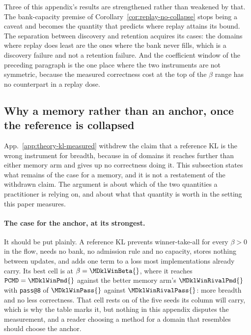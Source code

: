 \documentclass{article}
\newcommand{\1}{\mathbf 1}
\newcommand{\pmd}{\texttt{PCMD}}
\theoremstyle{remark}
\theoremstyle{definition}
\theoremstyle{plain}
\begin{document}
Three of this appendix's results are strengthened rather than weakened by that.
The bank-capacity premise of Corollary~\ref{cor:replay-no-collapse} stops being
a caveat and becomes the quantity that predicts where replay attains its bound.
The separation between discovery and retention acquires its cases: the domains
where replay does least are the ones where the bank never fills, which is a
discovery failure and not a retention failure. And the coefficient window of
the preceding paragraph is the one place where the two instruments are not
symmetric, because the measured correctness cost at the top of the $\beta$
range has no counterpart in a replay dose.

\subsection{Why a memory rather than an anchor, once the reference is collapsed}
\label{app:theory-kl-case}

App.~\ref{app:theory-kl-measured} withdrew the claim that a reference KL is the
wrong instrument for breadth, because in \MDklFreeDomains{} of \MDklDomains{}
domains it reaches further than either memory arm and gives up no correctness
doing it. This subsection states what remains of the
case for a memory, and it is not a restatement of the withdrawn claim. The
argument is about which of the two quantities a practitioner is relying on, and
about what that quantity is worth in the setting this paper measures.

\paragraph{The case for the anchor, at its strongest.}
It should be put plainly. A reference KL prevents winner-take-all for every
$\beta>0$ in the flow, needs no bank, no admission rule and no capacity, stores
nothing between updates, and adds one term to a loss most implementations
already carry. Its best cell is \MDklWinDomain{} at $\beta=\MDklWinBeta{}$,
where it reaches $\pmd{}=\MDklWinPmd{}$ against the better memory arm's
$\MDklWinRivalPmd{}$ with \texttt{pass@8} of $\MDklWinPass{}$ against
$\MDklWinRivalPass{}$: more breadth and no less correctness. That cell rests on
\MDklWinSeeds{} of the five seeds its column will carry, which is why the table
marks it, but nothing in this appendix disputes the measurement, and a reader
choosing a method for a domain that resembles \MDklWinDomain{} should choose
the anchor.
\end{document}

